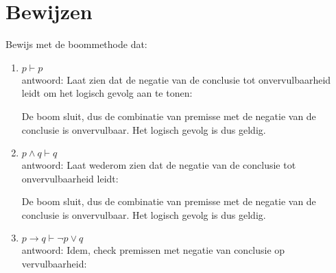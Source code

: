 \section{Bewijzen}

\begin{answer} %
Bewijs met de boommethode dat:
\begin{enumerate}[label=\textit{\alph*.}]
\item $p\vdash p$\\
antwoord: Laat zien dat de negatie van de conclusie tot onvervulbaarheid leidt om het logisch gevolg aan te tonen:
\begin{center}
\end{center}
De boom sluit, dus de combinatie van premisse met de negatie van de conclusie is onvervulbaar. Het logisch gevolg is dus geldig.
\item $p\wedge q\vdash q$\\
antwoord: Laat wederom zien dat de negatie van de conclusie tot onvervulbaarheid leidt:
\begin{center}
\end{center}
De boom sluit, dus de combinatie van premisse met de negatie van de conclusie is onvervulbaar. Het logisch gevolg is dus geldig.
\item $p\rightarrow q\vdash \neg p\vee q$\\
antwoord: Idem, check premissen met negatie van conclusie op vervulbaarheid:
\begin{center}
\end{center}
\end{enumerate}
\end{answer}
